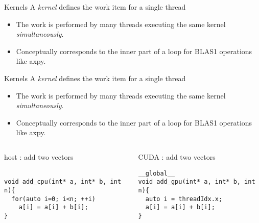 \documentclass[aspectratio=43]{beamer}
\newcommand{\axpy}{{\ttfamily axpy}\xspace}
\begin{document}
\begin{frame}[fragile]{Kernels}
    A \emph{kernel} defines the work item for a single thread
    \begin{itemize}
        \item The work is performed by many threads executing the same kernel \emph{simultaneously}.
        \item Conceptually corresponds to the inner part of a loop for BLAS1 operations like \axpy.
    \end{itemize}
\end{frame}

\begin{frame}[fragile]{Kernels}
    A \emph{kernel} defines the work item for a single thread
    \begin{itemize}
        \item The work is performed by many threads executing the same kernel \emph{simultaneously}.
        \item Conceptually corresponds to the inner part of a loop for BLAS1 operations like \axpy.
    \end{itemize}

    \vspace{-10pt}
    \begin{columns}[T]
        \begin{column}{0.5\textwidth}
            \begin{codecolumn}{host : add two vectors}
        \begin{lstlisting}[style=boxcudatiny]

void add_cpu(int* a, int* b, int n){
  for(auto i=0; i<n; ++i)
    a[i] = a[i] + b[i];
}
        \end{lstlisting}
            \end{codecolumn}
        \end{column}
        \begin{column}{0.5\textwidth}
            \begin{codecolumn}{CUDA : add two vectors}
        \begin{lstlisting}[style=boxcudatiny]
__global__
void add_gpu(int* a, int* b, int n){
  auto i = threadIdx.x;
  a[i] = a[i] + b[i];
}
        \end{lstlisting}
            \end{codecolumn}
        \end{column}
    \end{columns}


\end{frame}
\end{document}
